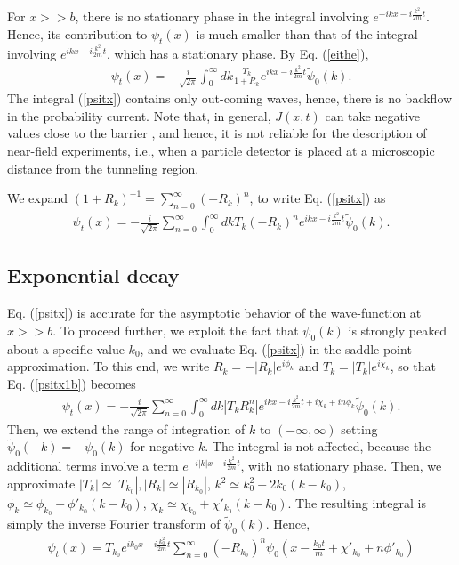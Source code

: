 \documentclass[12pt]{article}
\numberwithin{equation}{section}
\begin{document}
For $ x>> b$, there is no stationary phase in the integral involving $e^{-ikx -i\frac{k^2}{2m}t}$. Hence, its contribution to $\psi_t(x)$ is much smaller than that of  the integral involving $e^{ikx -i\frac{k^2}{2m}t}$, which has a stationary phase. By Eq.  (\ref{eithe}),
\begin{eqnarray}
\psi_t(x) = -\frac{i}{\sqrt{2\pi}} \int _0^{\infty} dk \frac{T_k}{1+R_k}  e^{ikx -i\frac{k^2}{2m}t } \tilde{\psi}_0(k). \label{psitx}
\end{eqnarray}
  The integral (\ref{psitx}) contains only out-coming waves, hence, there is  no backflow in the probability current. Note that, in general, $J(x, t)$ can take negative values close to the barrier \cite{Winter}, and hence, it is not reliable for the description of near-field experiments, i.e., when a particle detector is placed at a microscopic distance from the tunneling region.

We expand $(1+R_k)^{-1} = \sum_{n=0}^{\infty}(-R_k)^n$, to write Eq. (\ref{psitx}) as
\begin{eqnarray}
\psi_t(x) = -\frac{i}{\sqrt{2\pi}}\sum_{n=0}^{\infty}\int _0^{\infty} dk T_k(-R_k)^n  e^{ikx -i\frac{k^2}{2m}t } \tilde{\psi}_0(k). \label{psitx1b}
\end{eqnarray}

\subsection{Exponential decay }
Eq. (\ref{psitx}) is accurate for the asymptotic behavior of the wave-function at $x >> b$. To proceed further, we exploit the fact that $\psi_0(k)$ is strongly peaked about a specific value $k_0$, and we evaluate Eq. (\ref{psitx}) in the saddle-point approximation. To this end, we write
  $R_k = -|R_k|e^{i\phi_k}$ and $T_k = |T_k|e^{i\chi_k}$, so that Eq. (\ref{psitx1b}) becomes
\begin{eqnarray}
\psi_t(x) =  - \frac{i}{\sqrt{2\pi}}  \sum_{n=0}^{\infty}  \int _0^{\infty}dk |T_kR_k^n|  e^{ikx -i\frac{k^2}{2m}t + i \chi_k + i n \phi_k} \tilde{\psi}_0(k). \label{psitx2}
\end{eqnarray}
Then, we extend the range of integration of $k$ to $(-\infty, \infty)$ setting $\tilde{\psi}_0(-k) =  - \tilde{\psi}_0(k)$ for negative $k$. The integral is not affected, because the additional terms involve a term $e^{-i|k|x -i\frac{k^2}{2m}t}$, with no stationary phase. Then, we  approximate $|T_k| \simeq |T_{k_0}|, |R_k| \simeq |R_{k_0}|$, $k^2 \simeq k_0^2 + 2 k_0 (k-k_0)$, $\phi_k \simeq \phi_{k_0}+ \phi'_{k_0} (k-k_0)$, $\chi_k \simeq \chi_{k_0}+ \chi'_{k_0} (k-k_0)$. The resulting integral is simply the inverse Fourier transform of $\tilde{\psi}_0(k)$. Hence,
\begin{eqnarray}
\psi_t(x) =  T_{k_0}  e^{ik_0x -i\frac{k_0^2}{2m}t } \sum_{n=0}^{\infty} (-R_{k_0})^n \psi_0(x - \frac{k_0t}{m} + \chi'_{k_0} + n \phi'_{k_0}) \label{psitx3}
\end{eqnarray}
\end{document}
